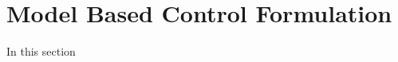 \section{Model Based Control Formulation}
\label{chUV_AMTC.sec.MBC_Formulation}

In this section 




